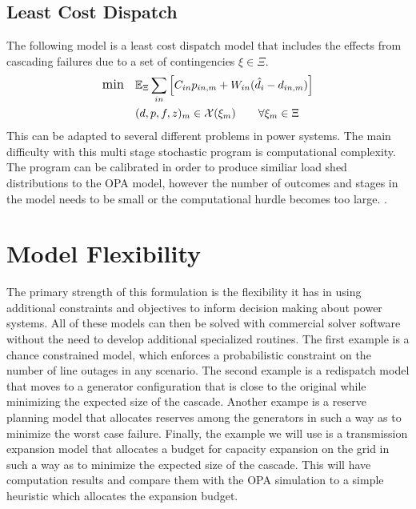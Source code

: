 \subsection{Least Cost Dispatch}
The following model is a least cost dispatch model that includes the effects from cascading failures due to a set of contingencies $\xi\in\Xi$.  
\begin{subequations}
\label{leastcost}
\begin{align} \displaystyle
	{\large \mbox{min}} \hspace{10px} &  \Expect_\Xi \sum_{in} \left[ C_{in}  p_{in,m}  + W_{in} (\hat{d}_{i} - d_{in,m}) \right]	\\
	&(d,p,f,z)_m  \in \cX(\xi_m)    \hspace{20px}   \forall \xi_m \in \Xi	
\end{align}
\end{subequations}
This can be adapted to several different problems in power systems.  The main difficulty with this multi stage stochastic program is computational complexity.  The program can be calibrated in order to produce similiar load shed distributions to the OPA model, however the number of outcomes and stages in the model needs to be small or the computational hurdle becomes too large.
.


\section{Model Flexibility}
The primary strength of this formulation is the flexibility it has in using additional constraints and objectives to inform decision making about power systems.  All of these models can then be solved with commercial solver software without the need to develop additional specialized routines.  The first example is a chance constrained model, which enforces a probabilistic constraint on the number of line outages in any scenario. \endnote{}  The second example is a redispatch model that moves to a generator configuration that is close to the original while minimizing the expected size of the cascade.\endnote{}  Another exampe is a reserve planning model that allocates reserves among the generators in such a way as to minimize the worst case failure.\endnote{}  Finally, the example we will use is a transmission expansion model that allocates a budget for capacity expansion on the grid in such a way as to minimize the expected size of the cascade.  This will have computation results and compare them with the OPA simulation to a simple heuristic which allocates the expansion budget.




